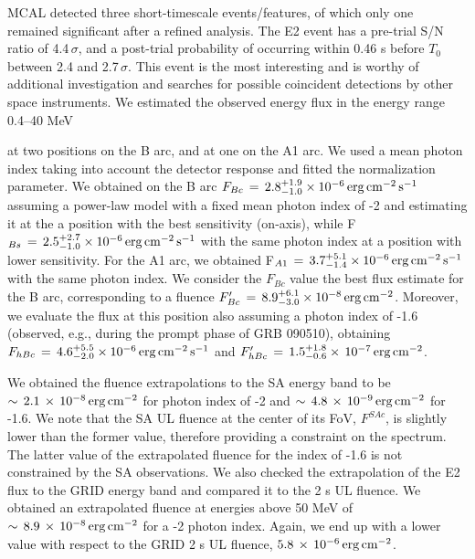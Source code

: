 \documentclass[preprint2]{aastex}
\def \fv {}
\def \fvv {}
\def \fvr {}
\begin{document}
{MCAL detected three short-timescale events/features, of which only
one remained significant after a refined analysis. The E2 event has a pre-trial
S/N ratio of 4.4\,$\sigma$, and a post-trial probability of occurring within
0.46 s before $T_0$ {\fv between {\fvr 2.4} and 2.7\,$\sigma$}.
This event is the most interesting and is
worthy of additional investigation and searches for possible
coincident detections by other space instruments. {\fvv We estimated t}he observed
energy flux in the energy range 0.4--40 MeV {\fvv at two positions on the B arc, and
at one on the A1 arc. We used a mean photon index taking into account the detector
response and fitted the normalization parameter.
We obtained on the B arc
$ F_{Bc}\,=\,2.8_{-1.0}^{+1.9} \times 10^{-6} \, \rm erg \,  cm^{-2} \, s^{-1}$ {\fv assuming
a power-law model with a fixed mean photon index of -2 and estimating it at the a position with the best sensitivity (on-axis)},
while F$_{Bs}\,=\,2.5_{-1.0}^{+2.7} \times 10^{-6} \, \rm erg \,  cm^{-2} \, s^{-1}$
with the same photon index at a position with lower sensitivity. For the A1 arc, we obtained
F$_{A1}\,=\,3.7_{-1.4}^{+5.1} \times 10^{-6} \, \rm erg \,  cm^{-2} \, s^{-1}$
with the same photon index. We consider the $F_{Bc}$ value the best flux estimate for the B arc,
corresponding to a fluence $F'_{Bc}\,=\,8.9_{-3.0}^{+6.1} \times 10^{-8} \, \rm  erg  \, cm^{-2}$.
 Moreover, we evaluate the flux at this position also assuming a photon index of -1.6 (observed, e.g.,
during the prompt phase of GRB 090510), obtaining $F_{hBc}\,=\,4.6_{-2.0}^{+5.5} \times
10^{-6} \, \rm erg \,  cm^{-2} \, s^{-1}$ and $F'_{hBc}\,=\,1.5_{-0.6}^{+1.8} \times\,
10^{-7} \, \rm  erg  \, cm^{-2}$.

We obtained the fluence extrapolations to the SA energy band to be
$\sim\,2.1\,\times\,10^{-8}\,\rm erg\, cm^{-2}$ for photon index of -2 and
$\sim\,4.8\,\times\,10^{-9}\,\rm erg\, cm^{-2}$ for -1.6.
We note that the SA UL fluence at the center of its FoV, $F^{SAc}$, is slightly lower
than the former value, therefore providing a constraint on the spectrum. The latter value of the extrapolated
fluence for the index of -1.6 is not constrained by the SA observations.
We also checked the extrapolation of the E2 flux to the GRID energy band and compared it
to the 2 s UL fluence. We obtained an extrapolated fluence at energies above 50 MeV of
$\sim\,8.9\,\times\,10^{-8}\,\rm erg\, cm^{-2}$  for a -2 photon index. Again, we end up
with a lower value with respect to the GRID 2 s UL fluence, $5.8\,\times\,10^{-6}\,\rm erg\, cm^{-2}$.}

}
\end{document}
